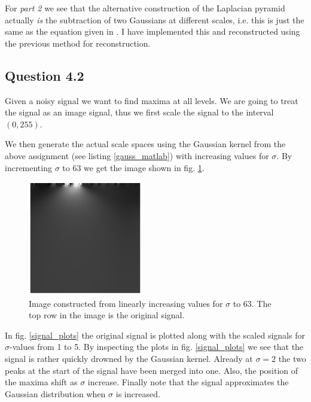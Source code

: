 \documentclass[a4paper, 10pt, final]{article}
\begin{document}
For \emph{part 2} we see that the alternative construction of the
Laplacian pyramid actually \emph{is} the subtraction of two Gaussians
at different scales, i.e. this is just the same as the equation given in
\citep[exercise 5.3]{jahne-digital}. I have implemented this and
reconstructed using the previous method for reconstruction.
\clearpage

\subsection*{Question 4.2}
Given a noisy signal we want to find maxima at all levels. We are
going to treat the signal as an image signal, thus we first scale the
signal to the interval $(0, 255)$.

We then generate the actual scale spaces using the Gaussian kernel from
the above assignment (see listing \ref{gauss_matlab}) with increasing
values for $\sigma$. By incrementing $\sigma$ to 63 we get the image
shown in fig. \ref{signal_image}.

\begin{figure}[!h]
    \centering
    \includegraphics[angle=0,width=0.45\textwidth]{images/signal_image}
    \caption{Image constructed from linearly increasing values for
    $\sigma$ to 63. The top row in the image is the original signal.}
    \label{signal_image}
\end{figure}

In fig. \ref{signal_plots} the original signal is plotted along with the
scaled signals for $\sigma$-values from 1 to 5.  By inspecting the plots
in fig. \ref{signal_plots} we see that the signal is rather quickly
drowned by the Gaussian kernel. Already at $\sigma = 2$ the two peaks at
the start of the signal have been merged into one. Also, the position of
the maxima shift as $\sigma$ increase.  Finally note that the signal
approximates the Gaussian distribution when $\sigma$ is increased.
\end{document}
